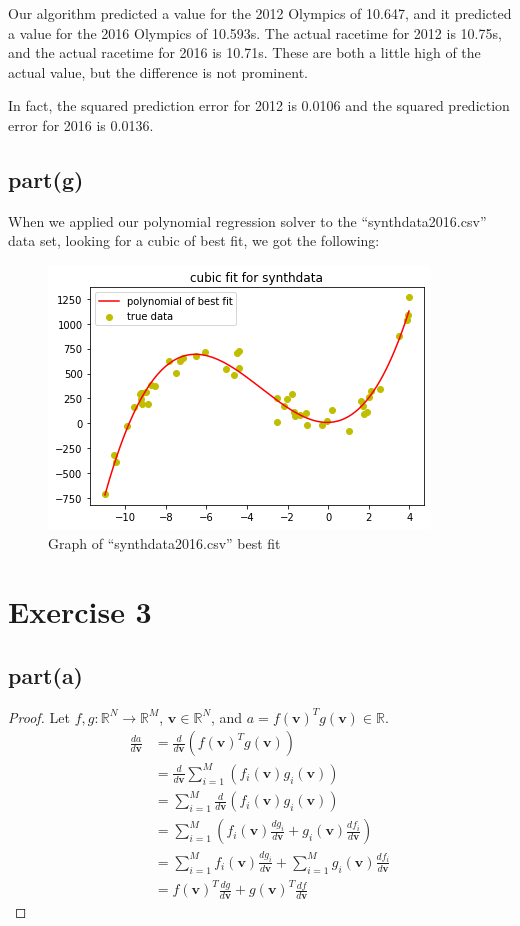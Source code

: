 \documentclass[12pt]{amsart}
\newcommand{\vect}[1]{\mathbf{#1}}
\begin{document}
Our algorithm predicted a value for the 2012 Olympics of 10.647, and it predicted a value for the 2016 Olympics of 10.593s. The actual racetime for 2012 is 10.75s, and the actual racetime for 2016 is 10.71s. These are both a little high of the actual value, but the difference is not prominent.

In fact, the squared prediction error for 2012 is 0.0106 and the squared prediction error for 2016 is 0.0136.

\subsection*{part(g)}

When we applied our polynomial regression solver to the ``synthdata2016.csv'' data set, looking for a cubic of best fit, we got the following:

\begin{figure}[H]
    \centering
    \includegraphics{Figure_synthdata.png}
    \caption{Graph of ``synthdata2016.csv'' best fit}
    \label{fig:my_label}
\end{figure}

\newpage

\section*{Exercise 3}
\subsection*{part(a)}
\begin{proof}
Let $f,g:\mathbb{R}^N\to\mathbb{R}^M$,  $\vect{v}\in\mathbb{R}^N$, and $a = f(\vect{v})^T g(\vect{v})\in \mathbb{R}$.
\begin{align*}
    \frac{da}{d\vect{v}} &= \frac{d}{d\vect{v}}(f(\vect{v})^T g(\vect{v}))\\
    &= \frac{d}{d\vect{v}} \sum_{i=1}^M (f_i(\vect{v})g_i(\vect{v}))\\
    &= \sum_{i=1}^M \frac{d}{d\vect{v}}(f_i(\vect{v})g_i(\vect{v}))\\
    &= \sum_{i=1}^M (f_i(\vect{v})\frac{dg_i}{d\vect{v}}+g_i(\vect{v})\frac{df_i}{d\vect{v}})\\
    &= \sum_{i=1}^M f_i(\vect{v})\frac{dg_i}{d\vect{v}} +\sum_{i=1}^M g_i(\vect{v})\frac{df_i}{d\vect{v}}\\
    &= f(\vect{v})^T\frac{dg}{d\vect{v}} +g(\vect{v})^T\frac{df}{d\vect{v}}
\end{align*}
\end{proof}
\end{document}
